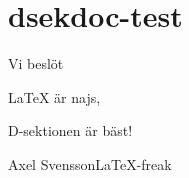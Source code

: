 \documentclass{dsekdoc}
\author{Axel Svensson}
\begin{document}
\coverpage

\maketitle
\section*{\textsf{dsekdoc}-test}
\lipsum[1-2]

Vi beslöt
\begin{attlist}
\item \LaTeX{} är najs,
\item \lipsum[4]
\item D-sektionen är bäst!
\end{attlist}

\lipsum[5-7]

\signature{Lund, dag som ovan}{Axel Svensson}{\LaTeX-freak}
\end{document}
